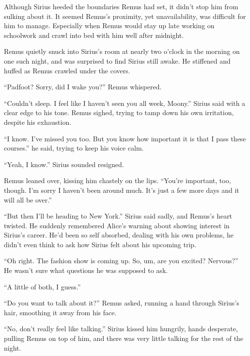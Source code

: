 \documentclass[12pt,twoside,openright]{memoir}
\begin{document}
Although Sirius heeded the boundaries Remus had set, it didn't stop him from sulking about it. It seemed Remus's proximity, yet unavailability, was difficult for him to manage. Especially when Remus would stay up late working on schoolwork and crawl into bed with him well after midnight.

Remus quietly snuck into Sirius's room at nearly two o'clock in the morning on one such night, and was surprised to find Sirius still awake. He stiffened and huffed as Remus crawled under the covers. 

``Padfoot? Sorry, did I wake you?'' Remus whispered.

``Couldn't sleep. I feel like I haven't seen you all week, Moony.'' Sirius said with a clear edge to his tone. Remus sighed, trying to tamp down his own irritation, despite his exhaustion. 

``I know. I've missed you too. But you know how important it is that I pass these courses.'' he said, trying to keep his voice calm.

``Yeah, I know.'' Sirius sounded resigned.

Remus leaned over, kissing him chastely on the lips. ``You're important, too, though. I'm sorry I haven't been around much. It's just a few more days and it will all be over.''

``But then I'll be heading to New York.'' Sirius said sadly, and Remus's heart twisted. He suddenly remembered Alice's warning about showing interest in Sirius's career. He'd been so self absorbed, dealing with his own problems, he didn't even think to ask how Sirius felt about his upcoming trip.

``Oh right. The fashion show is coming up. So, um, are you excited? Nervous?'' He wasn't sure what questions he was supposed to ask.

``A little of both, I guess.''

``Do you want to talk about it?'' Remus asked, running a hand through Sirius's hair, smoothing it away from his face.

``No, don't really feel like talking.'' Sirius kissed him hungrily, hands desperate, pulling Remus on top of him, and there was very little talking for the rest of the night. 
\end{document}
